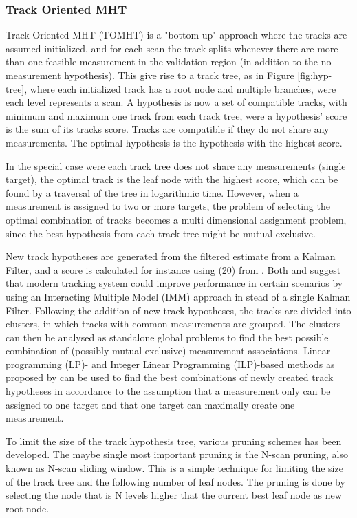 \subsubsection{Track Oriented MHT}
\label{subsec:tomht}
Track Oriented MHT (TOMHT) is a "bottom-up" approach where the tracks are assumed initialized, and for each scan the track splits whenever there are more than one feasible measurement in the validation region (in addition to the no-measurement hypothesis). This give rise to a track tree, as in Figure \ref{fig:hyp-tree}, where each initialized track has a root node and multiple branches, were each level represents a scan. A hypothesis is now a set of compatible tracks, with minimum and maximum one track from each track tree, were a hypothesis' score is the sum of its tracks score. Tracks are compatible if they do not share any measurements. The optimal hypothesis is the hypothesis with the highest score.

In the special case were each track tree does not share any measurements (single target), the optimal track is the leaf node with the highest score, which can be found by a traversal of the tree in logarithmic time. However, when a measurement is assigned to two or more targets, the problem of selecting the optimal combination of tracks becomes a multi dimensional assignment problem, since the best hypothesis from each track tree might be mutual exclusive.

New track hypotheses are generated from the filtered estimate from a Kalman Filter, and a score is calculated for instance using (20) from \cite{Bar-Shalom2007}. Both \cite{Bar-Shalom2007} and  \cite{Blackman2004} suggest that modern tracking system could improve performance in certain scenarios by using an Interacting Multiple Model (IMM) approach in stead of a single Kalman Filter. Following the addition of new track hypotheses, the tracks are divided into clusters, in which tracks with common measurements are grouped. The clusters can then be analysed as standalone global problems to find the best possible combination of (possibly mutual exclusive) measurement associations. Linear programming (LP)- and Integer Linear Programming (ILP)-based methods as proposed by \cite{Storms2003} can be used to find the best combinations of newly created track hypotheses in accordance to the assumption that a measurement only can be assigned to one target and that one target can maximally create one measurement.

To limit the size of the track hypothesis tree, various pruning schemes has been developed. The maybe single most important pruning is the N-scan pruning, also known as N-scan sliding window. This is a simple technique for limiting the size of the track tree and the following number of leaf nodes. The pruning is done by selecting the node that is N levels higher that the current best leaf node as new root node.

